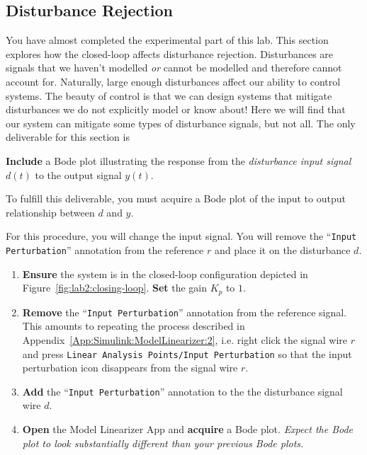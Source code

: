 \subsection{Disturbance Rejection}
You have almost completed the experimental part of this lab. This section
explores how the closed-loop affects disturbance rejection. Disturbances are
signals that we haven't modelled \emph{or} cannot be modelled and therefore
cannot account for. Naturally, large enough disturbances affect our ability to
control systems. The beauty of control is that we can design systems that
mitigate disturbances we do not explicitly model or know about! Here we will
find that our system can mitigate some types of disturbance signals, but not
all. The only deliverable for this section is
%
\begin{deliverable}[label={lab2:d4}]
  \textbf{Include} a Bode plot illustrating the response from the
  \emph{disturbance input signal} \(d(t)\) to the output signal \(y(t).\)
\end{deliverable}
%
To fulfill this deliverable, you must acquire a Bode plot of the input to
output relationship between \(d\) and \(y.\)
%
\begin{procedure}[label={proc:lab2:p5}]
  For this procedure, you will change the input signal. You will remove the
  ``\texttt{Input Perturbation}'' annotation from the reference \(r\) and
  place it on the disturbance \(d.\)

  \begin{enumerate}[label=(\arabic*)]
    \item{
      \textbf{Ensure} the system is in the closed-loop configuration
      depicted in Figure~\ref{fig:lab2:closing-loop}.
      \textbf{Set} the gain \(K_p\) to \(1.\)
    }
    \item{
      \textbf{Remove} the ``\texttt{Input Perturbation}'' annotation from
      the reference signal. This amounts to repeating the process described
      in Appendix~\ref{App:Simulink:ModelLinearizer:2}, i.e. right click the
      signal wire \(r\) and press
      \texttt{Linear Analysis Points/Input Perturbation} so that the
      input perturbation icon disappears from the signal wire \(r.\)
    }
    \item{
      \textbf{Add} the ``\texttt{Input Perturbation}'' annotation to the
      the disturbance signal wire \(d.\)
    }
    \item{
      \textbf{Open} the Model Linearizer App and \textbf{acquire} a Bode
      plot. \emph{Expect the Bode plot to look substantially different than
      your previous Bode plots.}
    }
  \end{enumerate}
\end{procedure}

